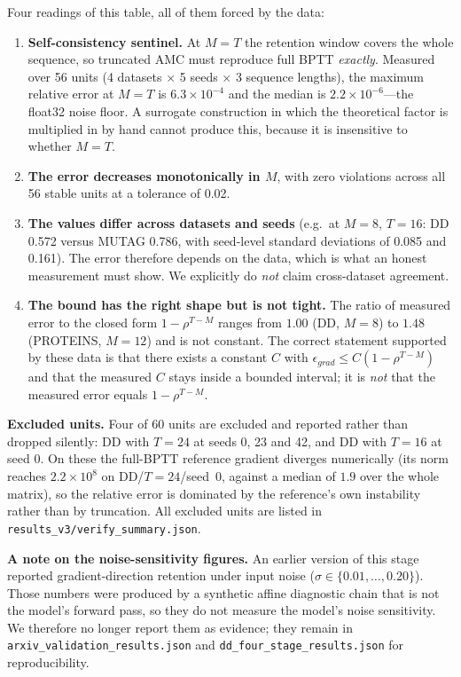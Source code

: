 \documentclass[a4paper,fleqn]{cas-dc}
\begin{document}
Four readings of this table, all of them forced by the data:

\begin{enumerate}
    \item \textbf{Self-consistency sentinel.} At $M{=}T$ the retention window covers the whole sequence, so truncated AMC must reproduce full BPTT \emph{exactly}. Measured over 56 units (4 datasets $\times$ 5 seeds $\times$ 3 sequence lengths), the maximum relative error at $M{=}T$ is $6.3\times10^{-4}$ and the median is $2.2\times10^{-6}$---the float32 noise floor. A surrogate construction in which the theoretical factor is multiplied in by hand cannot produce this, because it is insensitive to whether $M=T$.
    \item \textbf{The error decreases monotonically in $M$}, with zero violations across all 56 stable units at a tolerance of 0.02.
    \item \textbf{The values differ across datasets and seeds} (e.g.\ at $M{=}8$, $T{=}16$: DD 0.572 versus MUTAG 0.786, with seed-level standard deviations of 0.085 and 0.161). The error therefore depends on the data, which is what an honest measurement must show. We explicitly do \emph{not} claim cross-dataset agreement.
    \item \textbf{The bound has the right shape but is not tight.} The ratio of measured error to the closed form $1-\rho^{T-M}$ ranges from $1.00$ (DD, $M{=}8$) to $1.48$ (PROTEINS, $M{=}12$) and is not constant. The correct statement supported by these data is that there exists a constant $C$ with $\epsilon_{grad}\le C(1-\rho^{T-M})$ and that the measured $C$ stays inside a bounded interval; it is \emph{not} that the measured error equals $1-\rho^{T-M}$.
\end{enumerate}

\textbf{Excluded units.} Four of 60 units are excluded and reported rather than dropped silently: DD with $T{=}24$ at seeds 0, 23 and 42, and DD with $T{=}16$ at seed 0. On these the full-BPTT reference gradient diverges numerically (its norm reaches $2.2\times10^{8}$ on DD/$T{=}24$/seed~0, against a median of $1.9$ over the whole matrix), so the relative error is dominated by the reference's own instability rather than by truncation. All excluded units are listed in \texttt{results\_v3/verify\_summary.json}.

\textbf{A note on the noise-sensitivity figures.} An earlier version of this stage reported gradient-direction retention under input noise ($\sigma\in\{0.01,\dots,0.20\}$). Those numbers were produced by a synthetic affine diagnostic chain that is not the model's forward pass, so they do not measure the model's noise sensitivity. We therefore no longer report them as evidence; they remain in \texttt{arxiv\_validation\_results.json} and \texttt{dd\_four\_stage\_results.json} for reproducibility.
\end{document}
